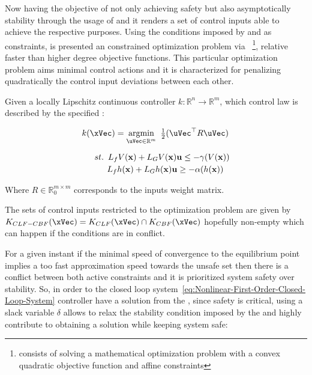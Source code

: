 Now having the objective of not only achieving  safety but also asymptotically  stability through the usage of  and  it renders a set of control inputs able to achieve the respective purposes. Using the conditions imposed by  and  as constraints, is presented an constrained optimization problem via ~\footnote{ consists of solving a mathematical optimization problem with a convex quadratic objective function and affine constraints}, relative faster than higher degree objective functions. This particular optimization problem aims minimal control actions and it is characterized for penalizing quadratically the control input deviations between each other. \par
Given a locally Lipschitz continuous controller \(k: \mathbb{R}^n \rightarrow \mathbb{R}^m \), which control law is described by the specified :

\begin{equation}
    \begin{array}{l}
        k(\xVec) = \underset{\uVec \in \mathbb{R}^m }{\mathrm{argmin}} \quad \hspace{-0.5em} \frac{1}{2} (\uVec^\top R \uVec) \vspace{1em} \\  
        \quad \hspace{0.5em}  st. \hspace{0.5em} L_fV(\mathbf{x}) + L_GV(\mathbf{x})\mathbf{u} \leq -\gamma(V(\mathbf{x})) \vspace{0.25em} \\ 
        \quad \quad \hspace{1em} L_fh(\mathbf{x}) + L_Gh(\mathbf{x})\mathbf{u} \geq -\alpha(h(\mathbf{x}))
    \end{array}
 \label{eq:CLF-CBF-QP}
\end{equation}

Where \(R \in \mathbb{R}^{m \times m}_{0}\) corresponds to the inputs weight matrix. \par

The sets of control inputs restricted to the optimization problem are given by \(K_{CLF-CBF}(\xVec) = K_{CLF}(\xVec) \cap  K_{CBF}(\xVec)\) hopefully non-empty which can happen if the conditions are in conflict.  \par

For a given instant if the minimal speed of convergence to the equilibrium point implies a too fast approximation speed towards the unsafe set then there is a conflict between both active constraints and it is prioritized system safety over stability. So, in order to the closed loop system~\eqref{eq:Nonlinear-First-Order-Closed-Loop-System} controller have a solution from the , since safety is critical, using a slack variable \(\delta\)  allows to relax the stability condition imposed by the  and highly contribute to obtaining a solution while keeping system safe:

